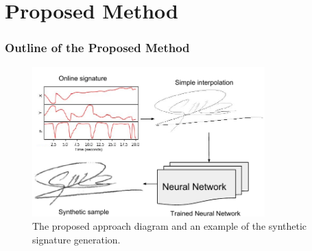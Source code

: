 \documentclass{beamer}
\begin{document}
\section{Proposed Method}
\begin{frame}
\frametitle{Outline of the Proposed Method}
\begin{figure}[!htb]
\centering
\includegraphics[width=0.8\textwidth]{method}
\caption{The proposed approach diagram and an example of the synthetic signature generation.}
\label{fig_approach}
\end{figure}
\end{frame}
\end{document}
